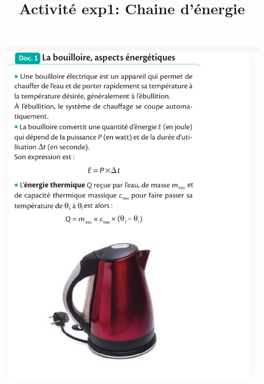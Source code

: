 \documentclass[10pt]{article}
\newcommand{\titreActivite}{\huge Activité exp1: Chaine d'énergie} %
\begin{document}
\date{}
\title{\titreActivite}
\maketitle %


\begin{minipage}[c]{0.45\textwidth}
	\centering
	\includegraphics[scale=0.5]{assets/doc1.png}
\end{minipage}
\hspace{20pt}
\end{document}
